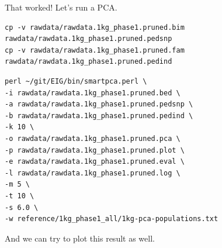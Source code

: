 \documentclass[
]{book}
\begin{document}
That worked! Let's run a PCA.

\begin{verbatim}
cp -v rawdata/rawdata.1kg_phase1.pruned.bim rawdata/rawdata.1kg_phase1.pruned.pedsnp
cp -v rawdata/rawdata.1kg_phase1.pruned.fam rawdata/rawdata.1kg_phase1.pruned.pedind
\end{verbatim}

\begin{verbatim}
perl ~/git/EIG/bin/smartpca.perl \
-i rawdata/rawdata.1kg_phase1.pruned.bed \
-a rawdata/rawdata.1kg_phase1.pruned.pedsnp \
-b rawdata/rawdata.1kg_phase1.pruned.pedind \
-k 10 \
-o rawdata/rawdata.1kg_phase1.pruned.pca \
-p rawdata/rawdata.1kg_phase1.pruned.plot \
-e rawdata/rawdata.1kg_phase1.pruned.eval \
-l rawdata/rawdata.1kg_phase1.pruned.log \
-m 5 \
-t 10 \
-s 6.0 \
-w reference/1kg_phase1_all/1kg-pca-populations.txt
\end{verbatim}

And we can try to plot this result as well.
\end{document}
